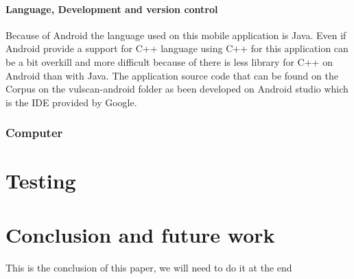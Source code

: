 \documentclass{report}
\begin{document}
\subsubsection{Language, Development and version control}
Because of Android the language used on this mobile application is Java. Even if Android provide a support for C++ language using C++ for this application can be a bit overkill and more difficult because of there is less library for C++ on Android than with Java.\newline
The application source code that can be found on the Corpus on the vulscan-android folder as been developed on Android studio which is the IDE provided by Google.

\subsection{Computer}

\chapter{Testing}

\chapter{Conclusion and future work}
This is the conclusion of this paper, we will need to do it at the end

\printbibliography

\listoffigures
\end{document}
